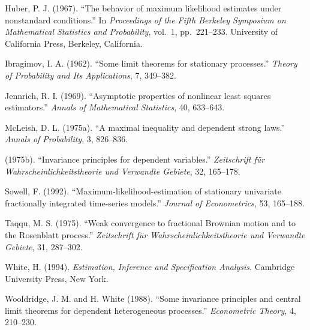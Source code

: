 \begin{description}
\item Huber, P. J. (1967). ``The behavior of maximum likelihood estimates under nonstandard conditions.'' In \emph{Proceedings of the Fifth Berkeley Symposium on Mathematical Statistics and Probability}, vol.\ 1, pp.\ 221--233. University of California
  Press, Berkeley, California.

\item Ibragimov, I. A. (1962). ``Some limit theorems for stationary processes.'' \emph{Theory
  of Probability and Its Applications}, 7, 349--382.

\item Jennrich, R. I. (1969). ``Asymptotic properties of nonlinear least squares estimators.'' \emph{Annals of Mathematical Statistics}, 40, 633--643.

\item McLeish, D. L. (1975a). ``A maximal inequality and dependent strong laws.''
  \emph{Annals of Probability}, 3, 826--836.

\item[\phantom{x}] (1975b). ``Invariance principles for dependent variables.'' \emph{Zeitschrift f\"ur
  Wahrscheinlichkeitstheorie und Verwandte Gebiete}, 32, 165--178.

\item Sowell, F. (1992). ``Maximum-likelihood-estimation of stationary univariate fractionally integrated time-series models.'' \emph{Journal of Econometrics}, 53, 165--188.

\item Taqqu, M. S. (1975). ``Weak convergence to fractional Brownian motion and to
  the Rosenblatt process.'' \emph{Zeitschrift f\"ur Wahrscheinlichkeitstheorie und Verwandte Gebiete}, 31, 287--302.

\item White, H. (1994). \emph{Estimation, Inference and Specification Analysis}. Cambridge
  University Press, New York.

\item Wooldridge, J. M. and H. White (1988). ``Some invariance principles and central
  limit theorems for dependent heterogeneous processes.'' \emph{Econometric Theory},
  4, 210--230.

\end{description}
